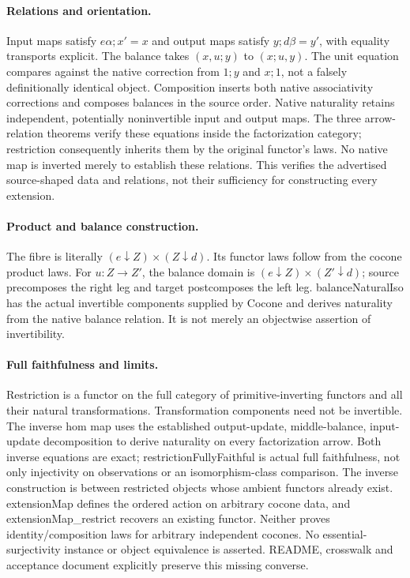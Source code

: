 \documentclass{article}
\begin{document}
\paragraph{Relations and orientation.} Input maps satisfy $e\alpha;x'=x$ and output maps satisfy $y;d\beta=y'$, with equality transports explicit. The balance takes $(x,u;y)$ to $(x;u,y)$. The unit equation compares against the native correction from $1;y$ and $x;1$, not a falsely definitionally identical object. Composition inserts both native associativity corrections and composes balances in the source order. Native naturality retains independent, potentially noninvertible input and output maps. The three arrow-relation theorems verify these equations inside the factorization category; restriction consequently inherits them by the original functor's laws. No native map is inverted merely to establish these relations. This verifies the advertised source-shaped data and relations, not their sufficiency for constructing every extension.
\paragraph{Product and balance construction.} The fibre is literally $(e\downarrow Z)\times(Z\downarrow d)$. Its functor laws follow from the cocone product laws. For $u:Z\to Z'$, the balance domain is $(e\downarrow Z)\times(Z'\downarrow d)$; source precomposes the right leg and target postcomposes the left leg. balanceNaturalIso has the actual invertible components supplied by Cocone and derives naturality from the native balance relation. It is not merely an objectwise assertion of invertibility.
\paragraph{Full faithfulness and limits.} Restriction is a functor on the full category of primitive-inverting functors and all their natural transformations. Transformation components need not be invertible. The inverse hom map uses the established output-update, middle-balance, input-update decomposition to derive naturality on every factorization arrow. Both inverse equations are exact; restrictionFullyFaithful is actual full faithfulness, not only injectivity on observations or an isomorphism-class comparison. The inverse construction is between restricted objects whose ambient functors already exist. extensionMap defines the ordered action on arbitrary cocone data, and extensionMap\_restrict recovers an existing functor. Neither proves identity/composition laws for arbitrary independent cocones. No essential-surjectivity instance or object equivalence is asserted. README, crosswalk and acceptance document explicitly preserve this missing converse.
\end{document}
